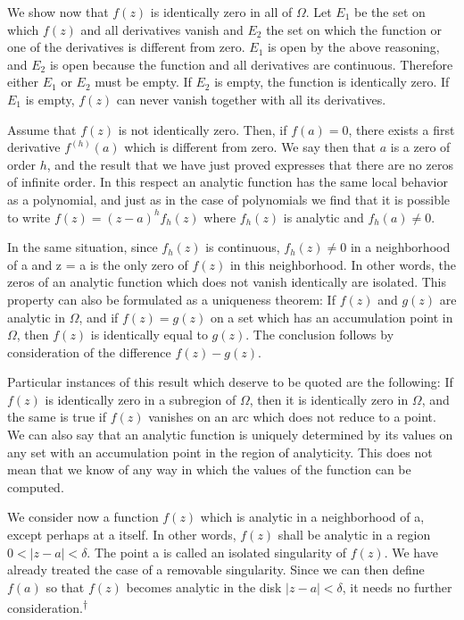 We show now that $f(z)$ is identically zero in all of $\Omega$. Let $E_{1}$ be the set on which $f(z)$ and all derivatives vanish and $E_{2}$ the set on which the function or one of the derivatives is different from zero. $E_{1}$ is open by the above reasoning, and $E_{2}$ is open because the function and all derivatives are continuous. Therefore either $E_{1}$ or $E_{2}$ must be empty. If $E_{2}$ is empty, the function is identically zero. If $E_{1}$ is empty, $f(z)$ can never vanish together with all its derivatives.

Assume that $f(z)$ is not identically zero. Then, if $f(a) = 0$, there exists a first derivative $f^{(h)}(a)$ which is different from zero. We say then that $a$ is a zero of order $h$, and the result that we have just proved expresses that there are no zeros of infinite order. In this respect an analytic function has the same local behavior as a polynomial, and just as in the case of polynomials we find that it is possible to write $f(z) = (z - a)^{h}f_{h}(z)$ where $f_{h}(z)$ is analytic and $f_{h}(a) \neq 0$.

In the same situation, since $f_{h}(z)$ is continuous, $f_{h}(z) \neq 0$ in a neighborhood of a and z = a is the only zero of $f(z)$ in this neighborhood. In other words, the zeros of an analytic function which does not vanish identically are isolated. This property can also be formulated as a uniqueness theorem: If $f(z)$ and $g(z)$ are analytic in $\Omega$, and if $f(z) = g(z)$ on a set which has an accumulation point in $\Omega$, then $f(z)$ is identically equal to $g(z)$. The conclusion follows by consideration of the difference $f(z) - g(z)$.

Particular instances of this result which deserve to be quoted are the following: If $f(z)$ is identically zero in a subregion of $\Omega$, then it is identically zero in $\Omega$, and the same is true if $f(z)$ vanishes on an arc which does not reduce to a point. We can also say that an analytic function is uniquely determined by its values on any set with an accumulation point in the region of analyticity. This does not mean that we know of any way in which the values of the function can be computed.

We consider now a function $f(z)$ which is analytic in a neighborhood of a, except perhaps at a itself. In other words, $f(z)$ shall be analytic in a region $0 < |z - a| < \delta$. The point a is called an isolated singularity of $f(z)$. We have already treated the case of a removable singularity. Since we can then define $f(a)$ so that $f(z)$ becomes analytic in the disk $|z - a| < \delta$, it needs no further consideration.\hyperlink{fn:143:dagger}{\textsuperscript{\ensuremath{\dagger}}}

